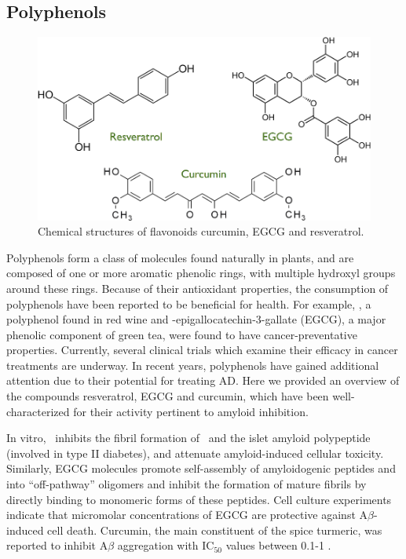 \subsection{Polyphenols}
\begin{figure}
\centering
\includegraphics[width=5.5in]{figures/introduction/polyphenols.pdf}
\caption[Polyphenol molecules]{Chemical structures of flavonoids curcumin, EGCG and resveratrol.}
\label{fig:polyphenols}
\end{figure}

Polyphenols form a class of molecules found naturally in plants, and are composed of one or more aromatic phenolic rings, with multiple hydroxyl groups around these rings.  Because of their antioxidant properties, the consumption of polyphenols have been reported to be beneficial for health.  For example, \resve, a polyphenol found in red wine and  -epigallocatechin-3-gallate (EGCG), a major phenolic component of green tea, were found to have cancer-preventative properties.\cite{Baur:2006bx,Singh:2011ec} Currently, several clinical trials which examine their efficacy in cancer treatments are underway.\cite{Baur:2006bx,Singh:2011ec} In recent years, polyphenols have gained additional attention due to their potential for treating AD.\cite{Porat:2006fn} Here we provided an overview of the compounds resveratrol, EGCG and curcumin, which have been well-characterized for their activity pertinent to amyloid inhibition.

In vitro, \resve\ inhibits the fibril formation of \abeta\ and the islet amyloid polypeptide (involved in type II diabetes), and attenuate amyloid-induced cellular toxicity.\cite{Ono:2008bl,Feng:2009p2240} Similarly, EGCG molecules promote self-assembly of amyloidogenic peptides \abeta\cite{Ehrnhoefer:2008fd} and \alphas\cite{Bieschke:2010ju} into ``off-pathway'' oligomers and inhibit the formation of mature fibrils by directly binding to monomeric forms of these peptides. Cell culture experiments indicate that micromolar concentrations of EGCG are protective against A$\beta$-induced cell death.\cite{Levites:2003wm,Bastianetto:2006du} Curcumin, the main constituent of the spice turmeric, was reported to inhibit A$\beta$ aggregation with IC$_{50}$ values between 0.1-1 \micromolar.\cite{Singh:2012df,Ono:2004td,Hamaguchi:2009p2874,Kim:2005wk} 


